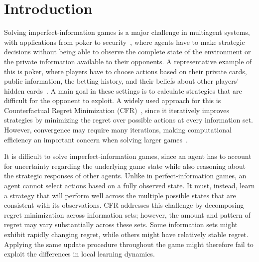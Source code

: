\section{Introduction}

Solving imperfect-information games is a major challenge in multiagent systems, with
applications from poker to security~\cite{tambe2011security}, where agents
have to make strategic decisions without being able to observe the complete state of the
environment or the private information available to their opponents. A representative example
of this is poker, where players have to choose actions based on their private cards, public
information, the betting history, and their beliefs about other players' hidden
cards~\cite{bowling2015heads, moravcik2017deepstack, brown2018superhuman, brown2019superhuman}. A main
goal in these settings is to calculate strategies that are difficult for the opponent to
exploit. A widely used approach for this is Counterfactual Regret Minimization
(CFR)~\cite{zinkevich2007regret}, since it iteratively improves strategies by minimizing the
regret over possible actions at every information set. However, convergence may require many
iterations, making computational efficiency an important concern when solving larger
games~\cite{tammelin2015solving}.

It is difficult to solve imperfect-information games, since an agent has to account for
uncertainty regarding the underlying game state while also reasoning about the strategic
responses of other agents. Unlike in perfect-information games, an agent cannot select actions
based on a fully observed state. It must, instead, learn a strategy that will perform well
across the multiple possible states that are consistent with its observations. CFR addresses
this challenge by decomposing regret minimization across information sets; however, the amount
and pattern of regret may vary substantially across these sets. Some information sets might
exhibit rapidly changing regret, while others might have relatively stable regret. Applying the
same update procedure throughout the game might therefore fail to exploit the differences in
local learning dynamics.

